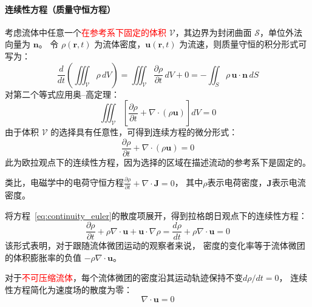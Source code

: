 \paragraph{连续性方程（质量守恒方程）}

考虑流体中任意一个\textcolor{red}{在参考系下固定的体积} $\mathcal{V}$，其边界为封闭曲面 $\mathcal{S}$，单位外法向量为 $\mathbf{n}$。
令 $\rho(\mathbf{r}, t)$ 为流体密度，$\mathbf{u}(\mathbf{r}, t)$ 为流速，则质量守恒的积分形式可写为：
\begin{equation}
\frac{d}{dt} \left( \iiint_{\mathcal{V}} \rho \, dV \right) 
=\iiint_{\mathcal{V}} \frac{\partial \rho}{\partial t} \, dV+0
= - \iint_{S} \rho \, \mathbf{u} \cdot \mathbf{n} \, dS
\end{equation}
对第二个等式应用奥--高定理：
\begin{equation}
\iiint_{\mathcal{V}} \left[ \frac{\partial \rho}{\partial t} + \nabla \cdot (\rho \mathbf{u}) \right] dV = 0
\end{equation}
由于体积 \( \mathcal{V} \) 的选择具有任意性，可得到连续方程的微分形式：
\begin{equation}\label{eq:continuity_euler}
\boxed{\frac{\partial \rho}{\partial t} + \nabla \cdot (\rho \mathbf{u}) = 0}
\end{equation}
此为欧拉观点下的连续性方程，因为选择的区域在描述流动的参考系下是固定的。

\begin{note}
类比，电磁学中的电荷守恒方程\(\frac{\partial \rho}{\partial t} + \nabla \cdot \mathbf{J} = 0\)，
其中\(\rho\)表示电荷密度，\(\mathbf{J}\)表示电流密度。
\end{note}

将方程~\eqref{eq:continuity_euler}的散度项展开，得到拉格朗日观点下的连续性方程：
\begin{equation}\label{eq:continuity_lagrange}
\frac{\partial \rho}{\partial t} + \rho \nabla \cdot \mathbf{u} + \mathbf{u} \cdot \nabla \rho
=\boxed{\frac{d\rho}{dt} + \rho \nabla \cdot \mathbf{u} = 0}
\end{equation}
该形式表明，对于跟随流体微团运动的观察者来说，
密度的变化率等于流体微团的体积膨胀率的负值 \( -\rho \nabla \cdot \mathbf{u} \)。

对于\textcolor{red}{不可压缩流体}，每个流体微团的密度沿其运动轨迹保持不变\(d\rho/dt = 0\)，
连续性方程简化为速度场的散度为零：
\begin{equation}\label{eq:continuity_incompressible}
\boxed{\nabla \cdot \mathbf{u} = 0}
\end{equation}

